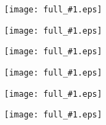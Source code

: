 \documentclass[landscape,a4paper]{article}
\newcommand{\image}[1]{
\begin{figure}%
\texttt{[image: full\_\#1.eps]}
\end{figure}%
}
\begin{document}
\image{000_title}
\image{010_trap}
\image{020_pulses}
\image{030_spectra}
\image{040_relax}
\image{999_black}
\end{document}
